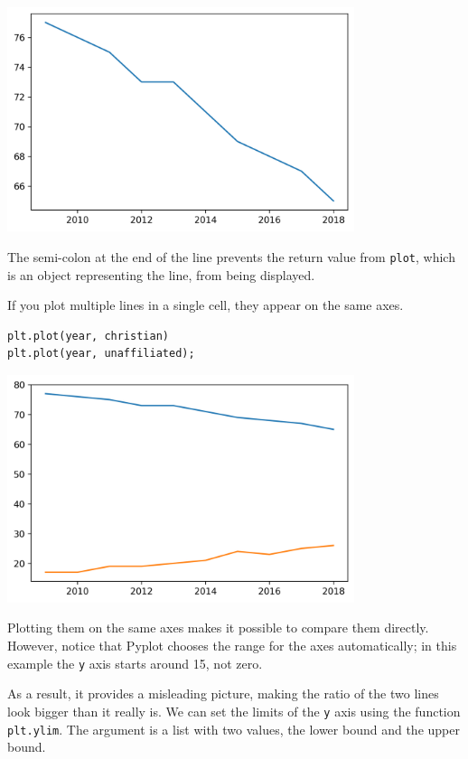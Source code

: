 \begin{center}
\includegraphics[width=4in]{chapters/06_plotting_files/06_plotting_22_0.png}
\end{center}

The semi-colon at the end of the line prevents the return value from
\passthrough{\lstinline!plot!}, which is an object representing the
line, from being displayed.

If you plot multiple lines in a single cell, they appear on the same
axes.

\begin{lstlisting}[]
plt.plot(year, christian)
plt.plot(year, unaffiliated);
\end{lstlisting}

\begin{center}
\includegraphics[width=4in]{chapters/06_plotting_files/06_plotting_24_0.png}
\end{center}

Plotting them on the same axes makes it possible to compare them
directly. However, notice that Pyplot chooses the range for the axes
automatically; in this example the \passthrough{\lstinline!y!} axis
starts around 15, not zero.

As a result, it provides a misleading picture, making the ratio of the
two lines look bigger than it really is. We can set the limits of the
\passthrough{\lstinline!y!} axis using the function
\passthrough{\lstinline!plt.ylim!}. The argument is a list with two
values, the lower bound and the upper bound.

